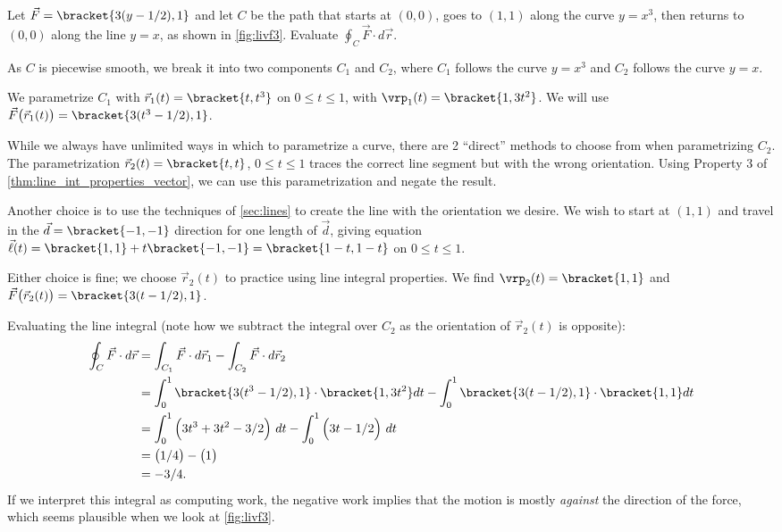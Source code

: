 {Let $\vec F =\bracket{3(y-1/2),1}$ and let $C$ be the path that starts at $(0,0)$, goes to $(1,1)$ along the curve $y=x^3$, then returns to $(0,0)$ along the line $y=x$, as shown in \autoref{fig:livf3}. Evaluate $\oint_C \vec F\cdot d\vec r$.}
{As $C$ is piecewise smooth, we break it into two components $C_1$ and $C_2$, where $C_1$ follows the curve $y=x^3$ and $C_2$ follows the curve $y=x$. 

We parametrize $C_1$ with $\vec r_1(t) =\bracket{t, t^3}$ on $0\leq t\leq 1$, with $\vrp_1(t) =\bracket{1,3t^2}$. We will use $\vec F\big(\vec r_1(t)\big) =\bracket{3(t^3-1/2),1}$.

While we always have unlimited ways in which to parametrize a curve, there are 2 ``direct'' methods to choose from when parametrizing $C_2$. The parametrization $\vec r_2(t)=\bracket{t,t}$, $0\leq t\leq 1$ traces the correct line segment but with the wrong orientation. Using Property 3 of \autoref{thm:line_int_properties_vector}, we can use this parametrization and negate the result.

Another choice is to use the techniques of \autoref{sec:lines} to create the line with the orientation we desire. We wish to start at $( 1,1)$ and travel in the $\vec d =\bracket{-1,-1}$ direction for one length of $\vec d$, giving equation $\vec \ell(t) =\bracket{1,1} + t\bracket{-1,-1} =\bracket{1-t,1-t}$ on $0\leq t\leq 1$.

Either choice is fine; we choose $\vec r_2(t)$ to practice using line integral properties. We find $\vrp_2(t) =\bracket{1,1}$ and $\vec F\big(\vec r_2(t)\big) =\bracket{3(t-1/2),1}$.

Evaluating the line integral (note how we subtract the integral over $C_2$ as the orientation of $\vec r_2(t)$ is opposite):
\begin{align*}
	\oint_C \vec F\cdot d\vec r
	&= \int_{C_1}\vec F\cdot d\vec r_1 - \int_{C_2}\vec F\cdot d\vec r_2 \\
	&= \int_0^1\bracket{3(t^3-1/2),1}\cdot\bracket{1,3t^2} dt
	- \int_0^1\bracket{3(t-1/2),1}\cdot\bracket{1,1}dt \\
	&= \int_0^1\Big(3t^3+3t^2-3/2\Big)\ dt - \int_0^1 \Big(3t-1/2\Big)\ dt\\
	&= \big(1/4 \big) - \big(1\big)\\
	&=	-3/4.
\end{align*}
If we interpret this integral as computing work, the negative work implies that the motion is mostly \emph{against} the direction of the force, which seems plausible when we look at \autoref{fig:livf3}.}


